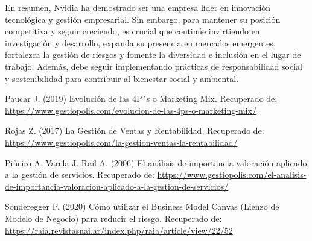 \documentclass{article}
\begin{document}
En resumen, Nvidia ha demostrado ser una empresa líder en innovación tecnológica y gestión empresarial. Sin embargo, para mantener su posición competitiva y seguir creciendo, es crucial que continúe invirtiendo en investigación y desarrollo, expanda su presencia en mercados emergentes, fortalezca la gestión de riesgos y fomente la diversidad e inclusión en el lugar de trabajo. Además, debe seguir implementando prácticas de responsabilidad social y sostenibilidad para contribuir al bienestar social y ambiental.


\newpage

\begin{thebibliography}{9}

  Paucar J. (2019) Evolución de las 4P´s o Marketing Mix. Recuperado de: \url{https://www.gestiopolis.com/evolucion-de-las-4ps-o-marketing-mix/}

  Rojas Z. (2017) La Gestión de Ventas y Rentabilidad. Recuperado de: \url{https://www.gestiopolis.com/la-gestion-ventas-la-rentabilidad/}

  Piñeiro A. Varela J. Rail A. (2006) El análisis de importancia-valoración aplicado a la gestión de servicios. Recuperado de: \url{https://www.gestiopolis.com/el-analisis-de-importancia-valoracion-aplicado-a-la-gestion-de-servicios/}

  Sonderegger P. (2020) Cómo utilizar el Business Model Canvas (Lienzo de Modelo de Negocio) para reducir el riesgo. Recuperado de: \url{https://raia.revistasuai.ar/index.php/raia/article/view/22/52}

\end{thebibliography}

  
\end{document}
